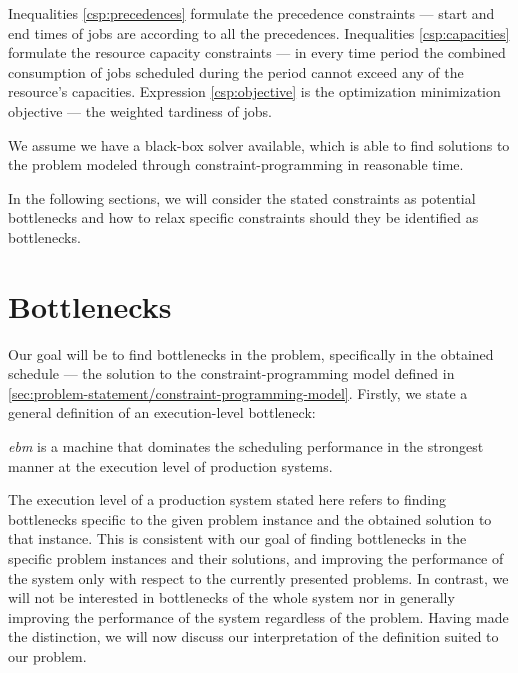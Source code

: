 Inequalities \eqref{csp:precedences} formulate the precedence constraints --- start and end times of jobs
are according to all the precedences.
Inequalities \eqref{csp:capacities} formulate the resource capacity constraints --- in every time period
the combined consumption of jobs scheduled during the period cannot exceed any of the resource's capacities.
Expression \eqref{csp:objective} is the optimization minimization objective --- the weighted tardiness of jobs.

We assume we have a black-box solver available,
which is able to find solutions to the problem modeled through constraint-programming in reasonable time.

In the following sections, we will consider the stated constraints as potential bottlenecks
and how to relax specific constraints should they be identified as bottlenecks.

\section{Bottlenecks} \label{sec:problem-statement/bottlenecks}


Our goal will be to find bottlenecks in the problem, specifically in the obtained schedule
--- the solution to the constraint-programming model defined in \cref{sec:problem-statement/constraint-programming-model}.
Firstly, we state a general definition of an execution-level bottleneck:

\begin{defn} \label{def:bottleneck}
    \emph{\ac{ebm}} is a machine that dominates the scheduling performance in the strongest manner
    at the execution level of production systems.
\end{defn}

The execution level of a production system stated here refers to finding bottlenecks
specific to the given problem instance and the obtained solution to that instance.
This is consistent with our goal of finding bottlenecks in the specific problem instances and their solutions,
and improving the performance of the system only with respect to the currently presented problems.
In contrast, we will not be interested in bottlenecks of the whole system
nor in generally improving the performance of the system regardless of the problem.
Having made the distinction, we will now discuss our interpretation of the definition suited to our problem.

